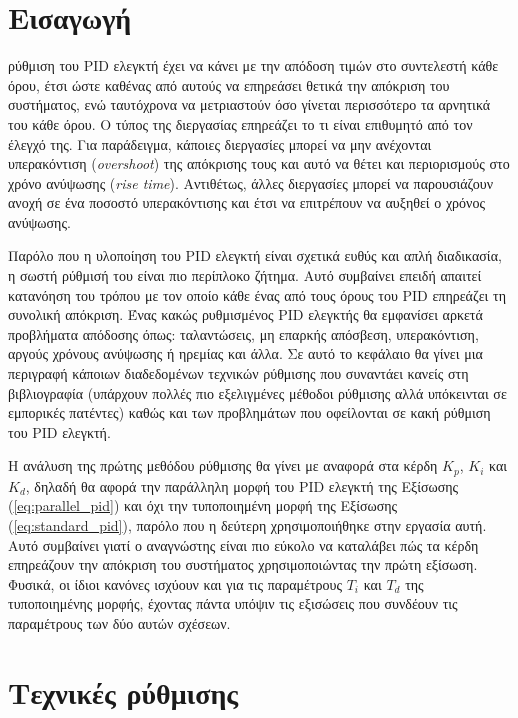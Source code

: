 


\section{Εισαγωγή}

\lettrine[findent=2pt]{}{} ρύθμιση του PID ελεγκτή έχει να κάνει με την απόδοση τιμών στο συντελεστή κάθε όρου, έτσι ώστε καθένας από αυτούς να επηρεάσει θετικά την απόκριση του συστήματος, ενώ ταυτόχρονα να μετριαστούν όσο γίνεται περισσότερο τα αρνητικά του κάθε όρου. Ο τύπος της διεργασίας επηρεάζει το τι είναι επιθυμητό από τον έλεγχό της. Για παράδειγμα, κάποιες διεργασίες μπορεί να μην ανέχονται υπερακόντιση (\emph{overshoot}) της απόκρισης τους και αυτό να θέτει και περιορισμούς στο χρόνο ανύψωσης (\emph{rise time}). Αντιθέτως, άλλες διεργασίες μπορεί να παρουσιάζουν ανοχή σε ένα ποσοστό υπερακόντισης και έτσι να επιτρέπουν να αυξηθεί ο χρόνος ανύψωσης.

Παρόλο που η υλοποίηση του PID ελεγκτή είναι σχετικά ευθύς και απλή διαδικασία, η σωστή ρύθμισή του είναι πιο περίπλοκο ζήτημα. Αυτό συμβαίνει επειδή απαιτεί κατανόηση του τρόπου με τον οποίο κάθε ένας από τους όρους του PID επηρεάζει τη συνολική απόκριση. Ένας κακώς ρυθμισμένος PID ελεγκτής θα εμφανίσει αρκετά προβλήματα απόδοσης όπως: ταλαντώσεις, μη επαρκής απόσβεση, υπερακόντιση, αργούς χρόνους ανύψωσης ή ηρεμίας και άλλα. Σε αυτό το κεφάλαιο θα γίνει μια περιγραφή κάποιων διαδεδομένων τεχνικών ρύθμισης που συναντάει κανείς στη βιβλιογραφία (υπάρχουν πολλές πιο εξελιγμένες μέθοδοι ρύθμισης αλλά υπόκεινται σε εμπορικές πατέντες) καθώς και των προβλημάτων που οφείλονται σε κακή ρύθμιση του PID ελεγκτή.

Η ανάλυση της πρώτης μεθόδου ρύθμισης θα γίνει με αναφορά στα κέρδη $K_p$, $K_i$ και $K_d$, δηλαδή θα αφορά την παράλληλη μορφή του PID ελεγκτή της Εξίσωσης (\ref{eq:parallel_pid}) και όχι την τυποποιημένη μορφή της Εξίσωσης (\ref{eq:standard_pid}), παρόλο που η δεύτερη χρησιμοποιήθηκε στην εργασία αυτή. Αυτό συμβαίνει γιατί ο αναγνώστης είναι πιο εύκολο να καταλάβει πώς τα κέρδη επηρεάζουν την απόκριση του συστήματος χρησιμοποιώντας την πρώτη εξίσωση. Φυσικά, οι ίδιοι κανόνες ισχύουν και για τις παραμέτρους $T_i$ και $T_d$ της τυποποιημένης μορφής, έχοντας πάντα υπόψιν τις εξισώσεις που συνδέουν τις παραμέτρους των δύο αυτών σχέσεων.

\section{Τεχνικές ρύθμισης}

